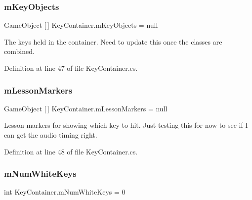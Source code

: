 \subsubsection{\texorpdfstring{m\+Key\+Objects}{mKeyObjects}}
{\footnotesize\ttfamily Game\+Object \mbox{[}$\,$\mbox{]} Key\+Container.\+m\+Key\+Objects = null\hspace{0.3cm}{\ttfamily [private]}}



The keys held in the container. Need to update this once the classes are combined. 



Definition at line 47 of file Key\+Container.\+cs.

\mbox{\label{group___key_contain_priv_var_gaf21490115ecf2b80c1bd382d7469a08c}} 
\subsubsection{\texorpdfstring{m\+Lesson\+Markers}{mLessonMarkers}}
{\footnotesize\ttfamily Game\+Object \mbox{[}$\,$\mbox{]} Key\+Container.\+m\+Lesson\+Markers = null\hspace{0.3cm}{\ttfamily [private]}}



Lesson markers for showing which key to hit. Just testing this for now to see if I can get the audio timing right. 



Definition at line 48 of file Key\+Container.\+cs.

\mbox{\label{group___key_contain_priv_var_ga7a5547a1fe5c40eac487fe6c826c8f9c}} 
\subsubsection{\texorpdfstring{m\+Num\+White\+Keys}{mNumWhiteKeys}}
{\footnotesize\ttfamily int Key\+Container.\+m\+Num\+White\+Keys = 0\hspace{0.3cm}{\ttfamily [private]}}



